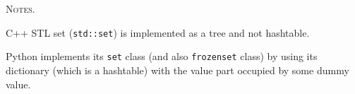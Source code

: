 
\textsc{Notes.}
\begin{tightlist}
  \item  C++ STL set (\verb!std::set!) is implemented as a tree and not
  hashtable.
  \item Python implements its
  \verb!set! class (and also \verb!frozenset! class)
  by using its dictionary (which is a hashtable)
  with the value part occupied by some dummy value.
\end{tightlist}
